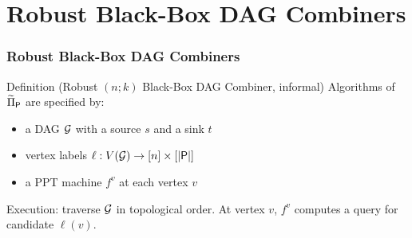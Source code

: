 \section{Robust Black-Box DAG Combiners}

\begin{frame}
    \frametitle{Robust Black-Box DAG Combiners}

    \begin{block}{Definition (Robust $(n;k)$ Black-Box DAG Combiner, informal)}
        Algorithms of $\DAGComb{P}$ are specified by:
        \begin{itemize}\setlength\itemsep{0.2em}
            \item a DAG $\mathcal{G}$ with a source $s$ and a sink $t$
            \item vertex labels $\ell : V(\mathcal{G}) \to [n] \times [\lvert\textup{\textsf{P}}\rvert]$
            \item a PPT machine $f^v$ at each vertex $v$
        \end{itemize}
        Execution: traverse $\mathcal{G}$ in topological order. At vertex $v$, $f^v$ computes a query for candidate $\ell(v)$.
    \end{block}

\end{frame}

